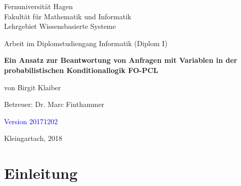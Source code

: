 \documentclass[a4paper, 11pt]{book}
\begin{document}
\begin{titlepage}
\thispagestyle{empty}
\begin{center}
\Large{Fernuniversität Hagen}\\
\Large{Fakultät für Mathematik und Informatik}\\
\Large{Lehrgebiet Wissensbasierte Systeme}\\[1.5cm]
\end{center}


\begin{center}
{Arbeit im Diplomstudiengang Informatik (Diplom I)}\\[2.0cm]
\end{center}

\begin{center}


\LARGE \textbf{Ein Ansatz zur Beantwortung von Anfragen mit Variablen in der probabilistischen Konditionallogik FO-PCL}\\[3.5cm]
\end{center}


\begin{center}
\large{von Birgit Klaiber}\\[3.5cm]
\end{center}

\begin{center}
\large{Betreuer: Dr. Marc Finthammer}\\[1.0cm]
\end{center}

\begin{center}
\textcolor{blue}{Version 20171202}
	
\large{Kleingartach, 2018}
\end{center}

\end{titlepage}






\begingroup



\setcounter{tocdepth}{1}

\tableofcontents
\clearpage
\endgroup
{}
\pagestyle{plain}
\setcounter{page}{1}
\pagestyle{headings}


\setlength{\parskip}{5pt}




\chapter{Einleitung}
\end{document}
